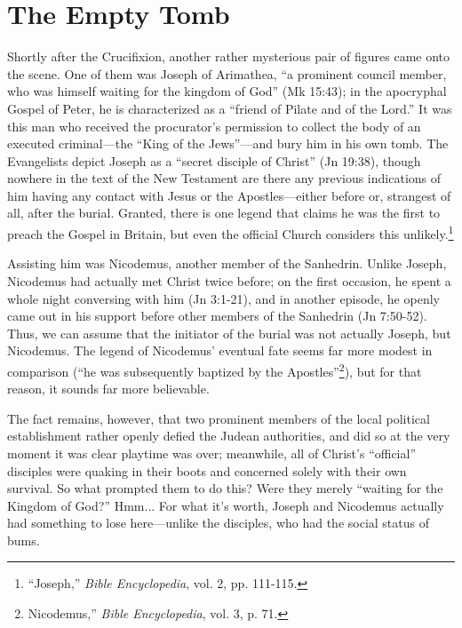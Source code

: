 \chapter*{The Empty Tomb}

Shortly after the Crucifixion, another rather mysterious pair of figures came onto the scene. One of them was Joseph of Arimathea, ``a prominent council member, who was himself waiting for the kingdom of God'' (Mk 15:43); in the apocryphal Gospel of Peter, he is characterized as a ``friend of Pilate and of the Lord.'' It was this man who received the procurator's permission to collect the body of an executed criminal---the ``King of the Jews''---and bury him in his own tomb. The Evangelists depict Joseph as a ``secret disciple of Christ'' (Jn 19:38), though nowhere in the text of the New Testament are there any previous indications of him having any contact with Jesus or the Apostles---either before or, strangest of all, after the burial. Granted, there is one legend that claims he was the first to preach the Gospel in Britain, but even the official Church considers this unlikely.\footnote{``Joseph,'' \emph{Bible Encyclopedia}, vol. 2, pp. 111-115.}

Assisting him was Nicodemus, another member of the Sanhedrin. Unlike Joseph, Nicodemus had actually met Christ twice before; on the first occasion, he spent a whole night conversing with him (Jn 3:1-21), and in another episode, he openly came out in his support before other members of the Sanhedrin (Jn 7:50-52). Thus, we can assume that the initiator of the burial was not actually Joseph, but Nicodemus. The legend of Nicodemus' eventual fate seems far more modest in comparison (``he was subsequently baptized by the Apostles''\footnote{Nicodemus,'' \emph{Bible Encyclopedia}, vol. 3, p. 71.}), but for that reason, it sounds far more believable.

The fact remains, however, that two prominent members of the local political establishment rather openly defied the Judean authorities, and did so at the very moment it was clear playtime was over; meanwhile, all of Christ's ``official'' disciples were quaking in their boots and concerned solely with their own survival. So what prompted them to do this? Were they merely ``waiting for the Kingdom of God?'' Hmm... For what it's worth, Joseph and Nicodemus actually had something to lose here---unlike the disciples, who had the social status of bums.


